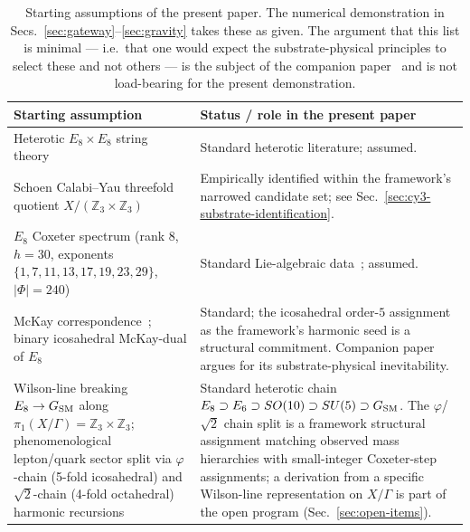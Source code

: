 ﻿\documentclass[reprint,amsmath,amssymb,aps,prd,longbibliography,floatfix]{revtex4-2}
\begin{document}
\begin{table}[t]
\centering
\caption{Starting assumptions of the present paper. The numerical demonstration in Secs.~\ref{sec:gateway}--\ref{sec:gravity} takes these as given. The argument that this list is minimal --- i.e.\ that one would expect the substrate-physical principles to select these and not others --- is the subject of the companion paper~\cite{UnreasonableEffectiveness} and is not load-bearing for the present demonstration.}
\label{tab:starting-assumptions}
\begin{tabular}{ll}
\toprule
Starting assumption & Status / role in the present paper \\
\midrule
\parbox[t]{0.32\textwidth}{Heterotic $E_8 \times E_8$ string theory~\cite{GHMR1985}} & \parbox[t]{0.62\textwidth}{Standard heterotic literature; assumed.} \\[0.5ex]
\parbox[t]{0.32\textwidth}{Schoen Calabi--Yau threefold quotient $X/(\mathbb{Z}_3 \times \mathbb{Z}_3)$~\cite{Schoen1988,BraunHeOvrutPantev2005,DonagiOvrut2005}} & \parbox[t]{0.62\textwidth}{Empirically identified within the framework's narrowed candidate set; see Sec.~\ref{sec:cy3-substrate-identification}.} \\[0.5ex]
\parbox[t]{0.32\textwidth}{$E_8$ Coxeter spectrum (rank $8$, $h=30$, exponents $\{1,7,11,13,17,19,23,29\}$, $|\Phi|=240$)} & \parbox[t]{0.62\textwidth}{Standard Lie-algebraic data~\cite{Humphreys1990}; assumed.} \\[0.5ex]
\parbox[t]{0.32\textwidth}{McKay correspondence~\cite{McKay1980}; binary icosahedral McKay-dual of $E_8$} & \parbox[t]{0.62\textwidth}{Standard; the icosahedral order-$5$ assignment as the framework's harmonic seed is a structural commitment. Companion paper argues for its substrate-physical inevitability.} \\[0.5ex]
\parbox[t]{0.32\textwidth}{Wilson-line breaking $E_8 \to G_{\rm SM}$ along $\pi_1(X/\Gamma) = \mathbb{Z}_3 \times \mathbb{Z}_3$; phenomenological lepton/quark sector split via $\varphi$-chain (5-fold icosahedral) and $\sqrt{2}$-chain (4-fold octahedral) harmonic recursions} & \parbox[t]{0.62\textwidth}{Standard heterotic chain $E_8 \supset E_6 \supset SO(10) \supset SU(5) \supset G_{\rm SM}$. The $\varphi$/$\sqrt{2}$ chain split is a framework structural assignment matching observed mass hierarchies with small-integer Coxeter-step assignments; a derivation from a specific Wilson-line representation on $X/\Gamma$ is part of the open program (Sec.~\ref{sec:open-items}).} \\[0.5ex]

\end{tabular}
\end{table}
\end{document}
